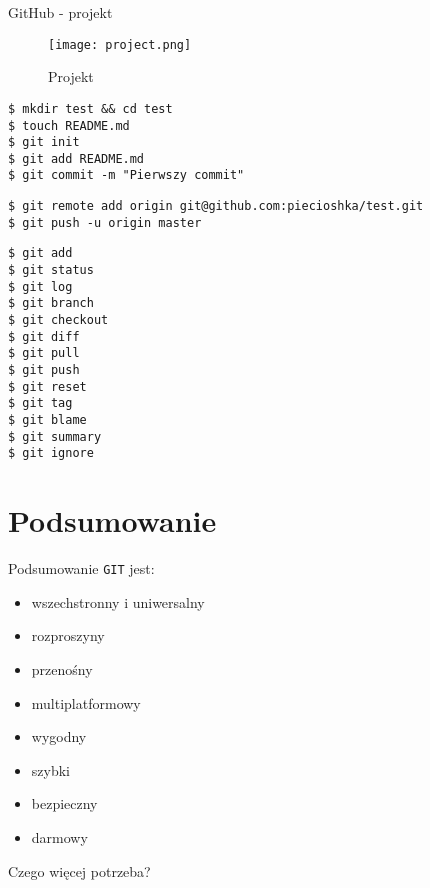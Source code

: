 \documentclass{beamer}
\begin{document}
\begin{frame}{GitHub - projekt}
	\begin{figure}
	\texttt{[image: project.png]}
	\caption{\label{fig:project}Projekt}
	\end{figure}
\end{frame}

\begin{framed}
\begin{lstlisting}[frame=none, caption=Praca lokalna]
$ mkdir test && cd test
$ touch README.md
$ git init
$ git add README.md
$ git commit -m "Pierwszy commit"
\end{lstlisting}
\end{framed}

\begin{framed}
\begin{lstlisting}[frame=none, caption=Praca zdalna]
$ git remote add origin git@github.com:piecioshka/test.git
$ git push -u origin master
\end{lstlisting}
\end{framed}

\begin{framed}
\begin{lstlisting}[frame=none, caption=Najpopularniejsze polecenia]
$ git add
$ git status
$ git log
$ git branch
$ git checkout
$ git diff
$ git pull
$ git push
$ git reset
$ git tag
$ git blame
$ git summary
$ git ignore
\end{lstlisting}
\end{framed}


\section{Podsumowanie}

\begin{frame}{Podsumowanie}
\texttt{GIT} jest:
\begin{itemize}
  \item wszechstronny i uniwersalny
  \item rozproszyny
  \item przenośny
  \item multiplatformowy
  \item wygodny
  \item szybki
  \item bezpieczny
  \item darmowy
\end{itemize}
\vskip 1cm
Czego więcej potrzeba?	
\end{frame}
\end{document}
